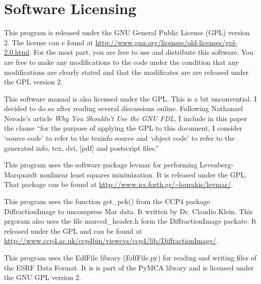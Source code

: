 \chapter{Software Licensing}

This program is released under the GNU General
Public License (GPL) version 2.
The license can e found at 
\url{http://www.gnu.org/licenses/old-licenses/gpl-2.0.html}.
For the most part, you are free to use and distribute 
this software. You are free to make any modifications to 
the code under the condition that any modifications are clearly 
stated and that the modificates are are released under the 
GPL version 2.

This software manual is also licensed under the GPL. 
This is a bit unconvential. I decided to do so after reading
several discussions online. Following Nathanael Nerode's 
article {\em Why You Shouldn't Use the GNU FDL}, I include in
this paper the clause ``for the purpose of applying the GPL to 
this document, I consider `source code' to refer to the texinfo 
source and `object code' to refer to the generated info, tex, 
dvi, [pdf] and postscript files.''\cite{Nerode03}

This program uses the software package
levmar for performing Levenberg-Marquardt nonlinear
least squares minimization.
It is released under the GPL. That package can be 
found at \url{http://www.ics.forth.gr/~lourakis/levmar/}.\cite{lourakis04LM}

This program uses the function get\_pck() from the CCP4 package
DiffractionImage to uncompress Mar data. It
written by Dr. Claudio Klein.\cite{Klein95} 
This prgoram also uses the file marccd\_header.h form
the DiffractionImage packate. It
released under the GPL and can be found at
\url{http://www.ccp4.ac.uk/ccp4bin/viewcvs/ccp4/lib/DiffractionImage/}.\cite{DiffractionImage}

This program uses the EdfFile library (EdfFile.py) for reading and 
writing files of the ESRF Data Format. It is is part of the PyMCA 
library and is licensed under the GNU GPL version 2.\cite{PyMCA}

